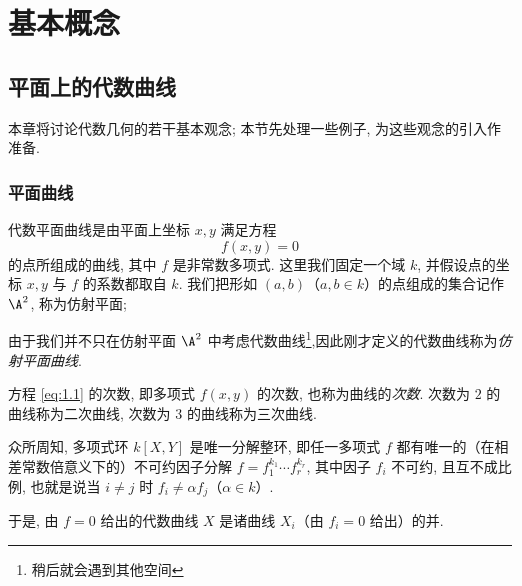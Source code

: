 
\chapter{基本概念}

\section{平面上的代数曲线}

本章将讨论代数几何的若干基本观念; 本节先处理一些例子, 为这些观念的引入作准备.

\subsection{平面曲线}

\begin{definition}[代数平面曲线]\label{def:plane-curve}
	代数平面曲线是由平面上坐标 $x, y$ 满足方程
	\begin{equation}
		\label{eq:1.1}
		f(x,y)=0
	\end{equation}
	的点所组成的曲线, 其中 $f$ 是非常数多项式. 这里我们固定一个域 $k$, 并假设点的坐标 $x, y$ 与 $f$ 的系数都取自 $k$. 我们把形如 $(a,b)$（$a, b \in k$）的点组成的集合记作 $\A^2$, 称为仿射平面;
	
	由于我们并不只在仿射平面 $\A^2$ 中考虑代数曲线\footnote{稍后就会遇到其他空间},因此刚才定义的代数曲线称为\emph{仿射平面曲线}.
\end{definition}

\begin{definition}[次数]\label{def:degree}
	方程 \eqref{eq:1.1} 的次数, 即多项式 $f(x,y)$ 的次数, 也称为曲线的\emph{次数}. 次数为 $2$ 的曲线称为二次曲线, 次数为 $3$ 的曲线称为三次曲线.
\end{definition}

众所周知, 多项式环 $k[X,Y]$ 是唯一分解整环, 即任一多项式 $f$ 都有唯一的（在相差常数倍意义下的）不可约因子分解 $f = f_1^{k_1} \cdots f_r^{k_r}$, 其中因子 $f_i$ 不可约, 且互不成比例, 也就是说当 $i \ne j$ 时 $f_i \ne \alpha f_j$（$\alpha \in k$）.

于是, 由 $f = 0$ 给出的代数曲线 $X$ 是诸曲线 $X_i$（由 $f_i = 0$ 给出）的并.

